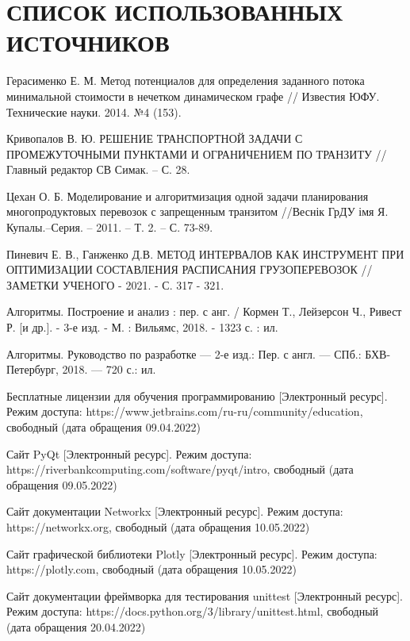 \section*{СПИСОК ИСПОЛЬЗОВАННЫХ ИСТОЧНИКОВ}

\begingroup
\renewcommand{\section}[2]{}
\begin{thebibliography}{}
	 Герасименко Е. М. Метод потенциалов для определения заданного потока минимальной стоимости в нечетком динамическом графе // Известия ЮФУ. Технические науки. 2014. №4 (153).
	
	 Кривопалов В. Ю. РЕШЕНИЕ ТРАНСПОРТНОЙ ЗАДАЧИ С ПРОМЕЖУТОЧНЫМИ ПУНКТАМИ И ОГРАНИЧЕНИЕМ ПО ТРАНЗИТУ //Главный редактор СВ Симак. – С. 28.
	
	 Цехан О. Б. Моделирование и алгоритмизация одной задачи планирования многопродуктовых перевозок с запрещенным транзитом //Веснік ГрДУ імя Я. Купалы.–Серия. – 2011. – Т. 2. – С. 73-89.
	
	  Пиневич Е. В., Ганженко Д.В. МЕТОД ИНТЕРВАЛОВ КАК ИНСТРУМЕНТ ПРИ ОПТИМИЗАЦИИ СОСТАВЛЕНИЯ РАСПИСАНИЯ ГРУЗОПЕРЕВОЗОК // ЗАМЕТКИ УЧЕНОГО - 2021. - С. 317 - 321.
	
	  Алгоритмы. Построение и анализ : пер. с анг. / Кормен Т., Лейзерсон Ч., Ривест Р. [и др.]. - 3-е изд. - М. : Вильямс, 2018. - 1323 с. : ил.
	
	
	 Алгоритмы. Руководство по разработке --- 2-е изд.: Пер. с англ. --- СПб.: БХВ-Петербург, 2018. --- 720 с.: ил.
	
	
	 Бесплатные лицензии для обучения программированию [Электронный ресурс]. Режим доступа: https://www.jetbrains.com/ru-ru/community/education, свободный (дата обращения 09.04.2022)
	
	 Сайт PyQt [Электронный ресурс]. Режим доступа: https://riverbankcomputing.com/software/pyqt/intro, свободный (дата обращения 09.05.2022)
	
	 Сайт документации Networkx [Электронный ресурс]. Режим доступа: https://networkx.org, свободный (дата обращения 10.05.2022)
	
	 Сайт графической библиотеки Plotly [Электронный ресурс]. Режим доступа: https://plotly.com, свободный (дата обращения 10.05.2022)
	
	 Сайт документации фреймворка для тестирования unittest [Электронный ресурс]. Режим доступа: https://docs.python.org/3/library/unittest.html, свободный (дата обращения 20.04.2022)
	
\end{thebibliography}
\endgroup

\pagebreak